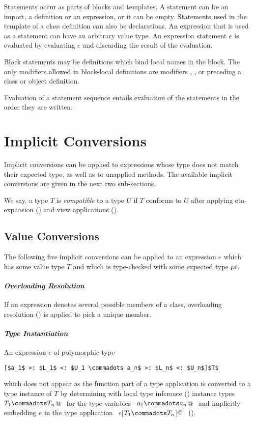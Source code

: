 Statements occur as parts of blocks and templates.  A statement can be
an import, a definition or an expression, or it can be empty.
Statements used in the template of a class definition can also be
declarations.  An expression that is used as a statement can have an
arbitrary value type. An expression statement $e$ is evaluated by
evaluating $e$ and discarding the result of the evaluation. 

Block statements may be definitions which bind local names in the
block. The only modifiers allowed in block-local definitions are modifiers
, , or  preceding a class or
object definition.

Evaluation of a statement sequence entails evaluation of the
statements in the order they are written.

\section{Implicit Conversions}
\label{sec:impl-conv}

Implicit conversions can be applied to expressions whose type does not
match their expected type, as well as to unapplied methods. The
available implicit conversions are given in the next two sub-sections.

We say, a type $T$ is {\em compatible} to a type $U$ if $T$ conforms
to $U$ after applying eta-expansion () and view applications
().

\subsection{Value Conversions}

The following five implicit conversions can be applied to an
expression $e$ which has some value type $T$ and which is type-checked with
some expected type $\mbox{\sl pt}$.

\paragraph{\em Overloading Resolution} 
If an expression denotes several possible members of a class, 
overloading resolution ()
is applied to pick a unique member.

\paragraph{\em Type Instantiation}  
An expression $e$ of polymorphic type
\begin{lstlisting}
[$a_1$ >: $L_1$ <: $U_1 \commadots a_n$ >: $L_n$ <: $U_n$]$T$
\end{lstlisting}
which does not appear as the function part of
a type application is converted to a type instance of $T$
by determining with local type inference
() instance types ~\lstinline@$T_1 \commadots T_n$@~ 
for the type variables ~\lstinline@$a_1 \commadots a_n$@~ and
implicitly embedding $e$ in the type application
~\lstinline@$e$[$T_1 \commadots T_n$]@~ ().

